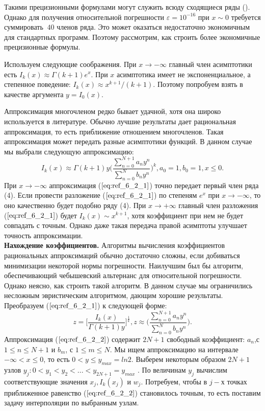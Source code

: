 Такими прецизионными формулами могут служить всюду сходящиеся ряды (). Однако для получения относительной погрешности $\varepsilon=10^{-16}$ при $x \sim 0$ требуется суммировать $~40$ членов ряда. Это может оказаться недостаточно экономичным для стандартных программ. Поэтому рассмотрим, как строить более экономичные прецизионные формулы.

Используем следующие соображения. При $x \to -\infty$ главный член асимптотики есть $I_k(x) \approx \Gamma(k+1) e^x$.
При $x$ асимптотика имеет не экспоненциальное, а степенное поведение: $I_k(x) \approx x^{k+1}/(k+1)$. Поэтому попробуем взять в качестве аргумента $y = I_0(x)$.

Аппроксимация многочленом редко бывает удачной, хотя она широко
используется в литературе. Обычно лучшие результаты дает рациональная
аппроксимация, то есть приближение отношением многочленов. Такая аппроксимация может передать разные асимптотики функций. В данном случае мы выбрали следующую аппроксимацию:
\begin{equation}
I_k(x) \approx \Gamma(k+1)y \Bigg( \frac{\sum\limits_{n=0}^{N+1} a_ny^{n}}{\sum\limits_{n=0}^{N} b_ny^{n}} \Bigg)^k,a_0=1,b_0=1,x \leqslant 0.
\label{eq:ref_6_2_1}
\end{equation}
При $x \to -\infty$ аппроксимация ($\ref{eq:ref_6_2_1}$) точно передает первый член ряда (4). Если
провести разложение ($\ref{eq:ref_6_2_1}$) по степеням $e^x$ при $x \to -\infty$, то оно качественно
будет подобно ряду (4). При $x \to +\infty$ главный член разложения ($\ref{eq:ref_6_2_1}$) будет
$I_k(x) \sim x^{k+1}$, хотя коэффициент при нем не будет совпадать с точным. Однако
даже такая передача правой асимптоты улучшает точность аппроксимации.
\\

\textbf{Нахождение коэффициентов.} Алгоритмы вычисления коэффициентов рациональных аппроксимаций
обычно достаточно сложны, если добиваться минимизации некоторой нормы
погрешности. Наилучшим был бы алгоритм, обеспечивающий чебышевский альтернанс для относительной погрешности. Однако неясно, как строить такой алгоритм. В данном случае мы ограничились несложным эвристическим алгоритмом, дающим хорошие результаты. Преобразуем ($\ref{eq:ref_6_2_1}$) к следующей
форме:
\begin{equation}
z = \bigg[ \frac{I_k(x)}{\Gamma(k+1)y} \bigg]^{\frac{1}{k}}, z \approx \Bigg( \frac{\sum\limits_{n=0}^{N+1} a_n y^n}{\sum\limits_{n=0}^{N} b_n y^n} \Bigg).
\label{eq:ref_6_2_2}
\end{equation}
Аппроксимация ($\ref{eq:ref_6_2_2}$) содержит $2N + 1$ свободный коэффициент: $a_n$,с $1 \leqslant n \leqslant N + 1$ и $b_m$, с $1 \leqslant m \leqslant N$.
Мы ищем аппроксимацию на интервале $-\infty < x \leqslant 0$, то есть $0 < y \leqslant y_{max} = ln2$. 
Выберем некоторым образом $2N +1$ узлов $y_j : 0 < y_1 < y_2 < ... < y_{2N+1} = y_{max}$ .
По величинам $y_j$ вычислим соответствующие значения $x_j, I_k(x_j)$ и $w_j$. Потребуем, чтобы в $j-$х точках приближенное равенство ($\ref{eq:ref_6_2_2}$) становилось точным, то есть поставим задачу интерполяции по выбранным узлам.

